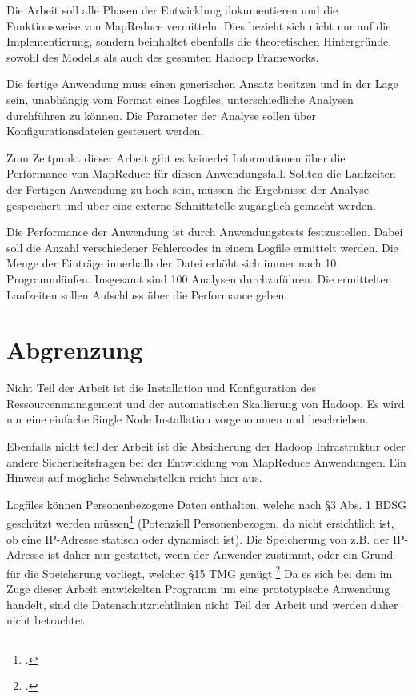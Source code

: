 Die Arbeit soll alle Phasen der Entwicklung dokumentieren und die Funktionsweise von MapReduce vermitteln. Dies bezieht sich nicht nur auf die Implementierung, sondern beinhaltet ebenfalls die theoretischen Hintergründe, sowohl des Modells als auch des gesamten Hadoop Frameworks.

Die fertige Anwendung muss einen generischen Ansatz besitzen und in der Lage sein, unabhängig vom Format eines Logfiles, unterschiedliche Analysen durchführen zu können. Die Parameter der Analyse sollen über Konfigurationsdateien gesteuert werden.

\newpage
Zum Zeitpunkt dieser Arbeit gibt es keinerlei Informationen über die Performance von MapReduce für diesen Anwendungsfall. Sollten die Laufzeiten der Fertigen Anwendung zu hoch sein, müssen die Ergebnisse der Analyse gespeichert und über eine externe Schnittstelle zugänglich gemacht werden.

Die Performance der Anwendung ist durch Anwendungstests festzustellen. Dabei soll die Anzahl verschiedener Fehlercodes in einem Logfile ermittelt werden. Die Menge der Einträge innerhalb der Datei erhöht sich immer nach 10 Programmläufen. Insgesamt sind 100 Analysen durchzuführen. Die ermittelten Laufzeiten sollen Aufschluss über die Performance geben.

\section{Abgrenzung}\label{sec:Abgrenzung}
Nicht Teil der Arbeit ist die Installation und Konfiguration des Ressourcenmanagement und der automatischen Skallierung von Hadoop. Es wird nur eine einfache Single Node Installation vorgenommen und beschrieben.

Ebenfalls nicht teil der Arbeit ist die Absicherung der Hadoop Infrastruktur oder andere Sicherheitsfragen bei der Entwicklung von MapReduce Anwendungen. Ein Hinweis auf mögliche Schwachstellen reicht hier aus.

Logfiles können Personenbezogene Daten enthalten, welche nach §3 Abs. 1 \ac{BDSG} geschützt werden müssen\footcite[§3 Abs. 1 BDSG,][]{BDSG3.1990} (Potenziell Personenbezogen, da nicht ersichtlich ist, ob eine \ac{IP}-Adresse statisch oder dynamisch ist). Die Speicherung von z.B. der \ac{IP}-Adresse ist daher nur gestattet, wenn der Anwender zustimmt, oder ein Grund für die Speicherung vorliegt, welcher §15 \ac{TMG} genügt.\footcite[§15 TMG,][]{TMG15.2007}  Da es sich bei dem im Zuge dieser Arbeit entwickelten Programm um eine prototypische Anwendung handelt, sind die Datenschutzrichtlinien nicht Teil der Arbeit und werden daher nicht betrachtet.


